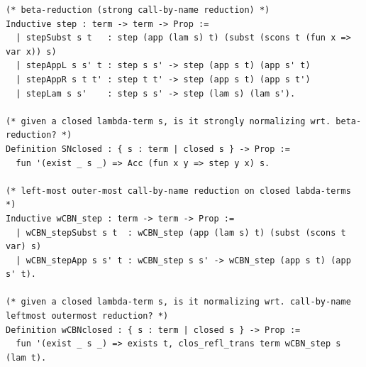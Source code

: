 \begin{lstlisting}
(* beta-reduction (strong call-by-name reduction) *)
Inductive step : term -> term -> Prop :=
  | stepSubst s t   : step (app (lam s) t) (subst (scons t (fun x => var x)) s)
  | stepAppL s s' t : step s s' -> step (app s t) (app s' t)
  | stepAppR s t t' : step t t' -> step (app s t) (app s t')
  | stepLam s s'    : step s s' -> step (lam s) (lam s').

(* given a closed lambda-term s, is it strongly normalizing wrt. beta-reduction? *)
Definition SNclosed : { s : term | closed s } -> Prop :=
  fun '(exist _ s _) => Acc (fun x y => step y x) s.

(* left-most outer-most call-by-name reduction on closed labda-terms *)
Inductive wCBN_step : term -> term -> Prop :=
  | wCBN_stepSubst s t  : wCBN_step (app (lam s) t) (subst (scons t var) s)
  | wCBN_stepApp s s' t : wCBN_step s s' -> wCBN_step (app s t) (app s' t).

(* given a closed lambda-term s, is it normalizing wrt. call-by-name leftmost outermost reduction? *)
Definition wCBNclosed : { s : term | closed s } -> Prop :=
  fun '(exist _ s _) => exists t, clos_refl_trans term wCBN_step s (lam t).

\end{lstlisting}

